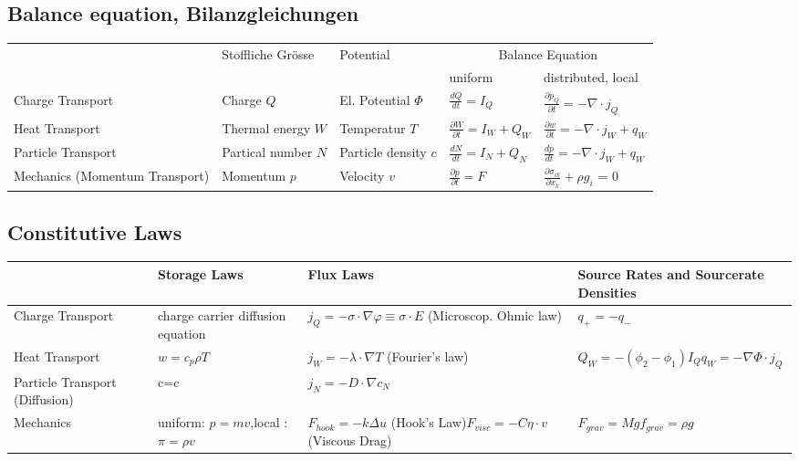 {	\subsection{Balance equation, Bilanzgleichungen}
	{
		\begin{tabularx}{\linewidth}{XXXll}
			\hline
			& Stoffliche Grösse & Potential & \multicolumn{2}{c}{Balance Equation} \\
			& & & uniform & distributed, local \\ \hline\hline
			Charge Transport & Charge $Q$ & El. Potential $\Phi$ & $\frac{dQ}{dt}=I_Q$ & $ \frac{\partial p_Q}{\partial t}=-\nabla\cdot j_Q$ \\ \hline
			Heat Transport & Thermal energy \newline $W$ & Temperatur $T$ & $\frac{\partial W}{\partial t}= I_W+Q_W$ & $\frac{\partial w}{\partial t}= -\nabla \cdot j_W+q_W$  \\ \hline
			Particle Transport & Partical number \newline $N$ & Particle density \newline $c$ & $\frac{dN}{dt}=I_N+Q_N$ & $\frac{dp}{dt}=-\nabla \cdot j_W +q_W$ \\ \hline
			Mechanics (Momentum Transport) & Momentum $p$ & Velocity $v$  & $\frac{\partial p}{\partial t}=F$ &  $\frac{\partial \sigma_{ik}}{\partial x_k} + \rho g_i$ = 0\\ 
			\hline
		\end{tabularx} }
		
		\subsection{Constitutive Laws}
		\begin{tabularx}{\linewidth}{Xp{3cm}p{4.55cm}X}
			\hline
			& Storage Laws & Flux Laws & Source Rates and Sourcerate Densities \\ \hline
			Charge Transport & charge carrier diffusion equation & $j_Q=-\sigma \cdot \nabla\varphi \equiv \sigma \cdot E$ \newline (Microscop. Ohmic law) & $q_+ = - q_-$ \\
			Heat Transport & $w=c_p \rho T$ & $j_W=-\lambda \cdot \nabla T$  (Fourier's law)& $Q_W = -(\phi_2-\phi_1)I_Q$\newline $q_W = -\nabla\Phi\cdot j_Q$  \\ 
			Particle Transport (Diffusion) & c=c & $j_N=- D \cdot \nabla c_N$ &  \\ 
			Mechanics & uniform: $p=mv$,\newline local : $\pi=\rho v$ & $F_{hook} = - k \Delta u$ (Hook's Law)\newline $F_{visc}=-C \eta \cdot v$ (Viscous Drag) & $F_{grav} = M g$\newline $f_{grav}=\rho g$ \\ 
			\hline
		\end{tabularx} 
		
		

}%

